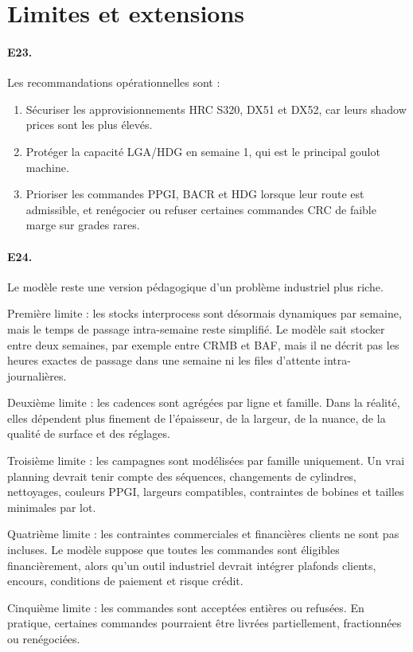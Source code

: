 \documentclass[12pt,a4paper]{article}
\newcommand{\question}[1]{\paragraph{\textcolor{blue!50!black}{#1.}}}
\newcommand{\sectiontarget}[1]{}
\begin{document}
\clearpage
\section{Limites et extensions}
\sectiontarget{1 a 2 pages}

\question{E23}
Les recommandations opérationnelles sont :

\begin{enumerate}
    \item Sécuriser les approvisionnements HRC S320, DX51 et DX52, car leurs shadow prices sont les plus élevés.
    \item Protéger la capacité LGA/HDG en semaine 1, qui est le principal goulot machine.
    \item Prioriser les commandes PPGI, BACR et HDG lorsque leur route est admissible, et renégocier ou refuser certaines commandes CRC de faible marge sur grades rares.
\end{enumerate}

\question{E24}
Le modèle reste une version pédagogique d'un problème industriel plus riche.

Première limite : les stocks interprocess sont désormais dynamiques par semaine, mais le temps de passage intra-semaine reste simplifié. Le modèle sait stocker entre deux semaines, par exemple entre CRMB et BAF, mais il ne décrit pas les heures exactes de passage dans une semaine ni les files d'attente intra-journalières.

Deuxième limite : les cadences sont agrégées par ligne et famille. Dans la réalité, elles dépendent plus finement de l'épaisseur, de la largeur, de la nuance, de la qualité de surface et des réglages.

Troisième limite : les campagnes sont modélisées par famille uniquement. Un vrai planning devrait tenir compte des séquences, changements de cylindres, nettoyages, couleurs PPGI, largeurs compatibles, contraintes de bobines et tailles minimales par lot.

Quatrième limite : les contraintes commerciales et financières clients ne sont pas incluses. Le modèle suppose que toutes les commandes sont éligibles financièrement, alors qu'un outil industriel devrait intégrer plafonds clients, encours, conditions de paiement et risque crédit.

Cinquième limite : les commandes sont acceptées entières ou refusées. En pratique, certaines commandes pourraient être livrées partiellement, fractionnées ou renégociées.
\end{document}
